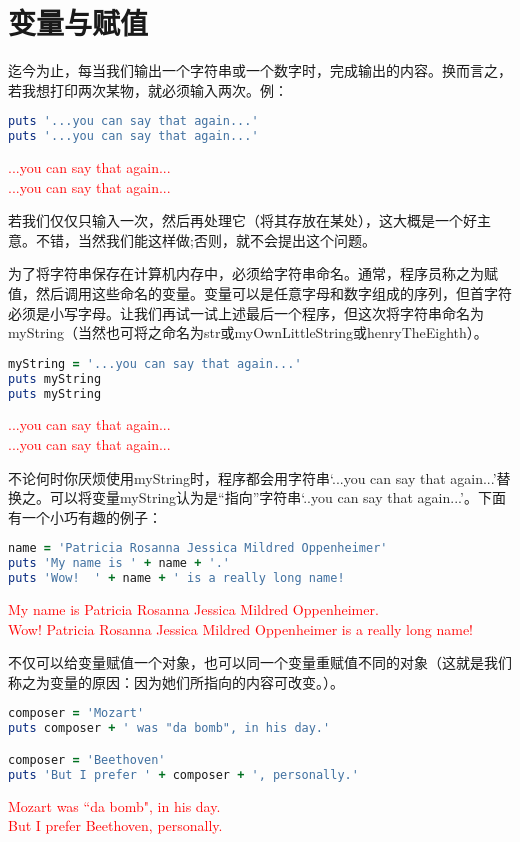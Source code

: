 \chapter{变量与赋值}

迄今为止，每当我们输出一个字符串或一个数字时，完成输出的内容。换而言之，若我想打印两次某物，就必须输入两次。例： \\

\begin{lstlisting}[language=ruby]
puts '...you can say that again...'
puts '...you can say that again...'
\end{lstlisting}
\textcolor{red}{
...you can say that again...\\
...you can say that again...
}

若我们仅仅只输入一次，然后再处理它（将其存放在某处），这大概是一个好主意。不错，当然我们能这样做;否则，就不会提出这个问题。

为了将字符串保存在计算机内存中，必须给字符串命名。通常，程序员称之为赋值，然后调用这些命名的变量。变量可以是任意字母和数字组成的序列，但首字符必须是小写字母。让我们再试一试上述最后一个程序，但这次将字符串命名为myString（当然也可将之命名为str或myOwnLittleString或henryTheEighth）。\\
\begin{lstlisting}[language=ruby]
myString = '...you can say that again...'
puts myString
puts myString
\end{lstlisting}
\textcolor{red}{
...you can say that again...\\
...you can say that again...
}

不论何时你厌烦使用myString时，程序都会用字符串`...you can say that again...'替换之。可以将变量myString认为是“指向”字符串`..you can say that again...'。下面有一个小巧有趣的例子：

\begin{lstlisting}[language=ruby]
name = 'Patricia Rosanna Jessica Mildred Oppenheimer'
puts 'My name is ' + name + '.'
puts 'Wow!  ' + name + ' is a really long name!
\end{lstlisting}
\textcolor{red}{
My name is Patricia Rosanna Jessica Mildred Oppenheimer.\\
Wow!  Patricia Rosanna Jessica Mildred Oppenheimer is a really long name!
}

不仅可以给变量赋值一个对象，也可以同一个变量重赋值不同的对象（这就是我们称之为变量的原因：因为她们所指向的内容可改变。）。
\begin{lstlisting}[language=ruby]
composer = 'Mozart'
puts composer + ' was "da bomb", in his day.'

composer = 'Beethoven'
puts 'But I prefer ' + composer + ', personally.'
\end{lstlisting}
\textcolor{red}{
Mozart was ``da bomb", in his day.\\
But I prefer Beethoven, personally.
}


